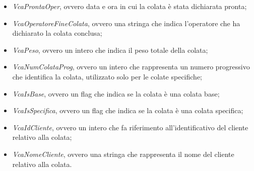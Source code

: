\begin{itemize}
    \item \textit{VcaProntaOper}, ovvero data e ora in cui la colata è stata dichiarata pronta;
    \item \textit{VcaOperatoreFineColata}, ovvero una stringa che indica l'operatore che ha dichiarato la colata conclusa;
    \item \textit{VcaPeso}, ovvero un intero che indica il peso totale della colata;
    \item \textit{VcaNumColataProg}, ovvero un intero che rappresenta un numero progressivo che identifica la colata, utilizzato
    solo per le colate specifiche;
    \item \textit{VcaIsBase}, ovvero un flag che indica se la colata è una colata base;
    \item \textit{VcaIsSpecifica}, ovvero un flag che indica se la colata è una colata specifica;
    \item \textit{VcaIdCliente}, ovvero un intero che fa riferimento all'identificativo del cliente relativo alla colata;
    \item \textit{VcaNomeCliente}, ovvero una stringa che rappresenta il nome del cliente relativo alla colata.
  \end{itemize}
  

